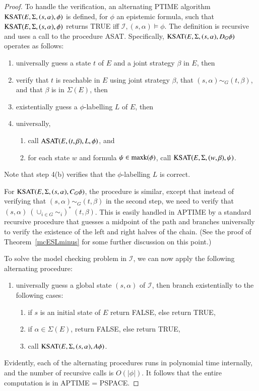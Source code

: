 \documentclass[a4wide]{article}
\theoremstyle{examplesty}
\newcommand{\I}{\mathcal{I}}
\newcommand{\Env}{E}
\newcommand{\be}{\begin{enumerate}}
\newcommand{\ee}{\end{enumerate}}
\newcommand{\Strat}{\Sigma}
\newcommand{\Strats}{\Sigma}
\newcommand{\ksubf}{{\rm maxk}}
\newcommand{\KSAT}{{\rm KSAT}}
\newcommand{\ASAT}{{\rm ASAT}}
\begin{document}
\begin{proof}
To handle the verification, an alternating PTIME algorithm  $\KSAT(E,\Strats, (s,\alpha), \phi)$  is defined, for 
$\phi$ an epistemic formula, such that $\KSAT(E,\Strats, (s,\alpha), \phi)$ returns TRUE 
iff  $\I, (s,\alpha) \models  \phi$.  The definition is recursive and uses a call to the  procedure ASAT. 
Specifically, 
$\KSAT(E,\Strats, (s,\alpha), D_G\phi)$ operates as follows: 
\be 
\item universally guess a state $t$ of $E$ and a joint strategy $\beta$ in $E$, then 


\item  verify that $t$ is reachable in $E$ using joint strategy $\beta$, 
that $(s,\alpha) \sim_G (t,\beta)$, and that $\beta$ is in $\Strats(E)$, then 

\item existentially guess a $\phi$-labelling $L$ of $E$,  then 

\item universally, 
\be \item 
call $\ASAT(E,(t,\beta),L,\phi)$, and 
\item for each state $w$ and formula $\psi \in \ksubf(\phi)$, 
call $\KSAT(E,\Strats, (w,\beta), \psi)$.  
\ee
\ee
Note that  step 4(b) verifies that the 
$\phi$-labelling $L$ is correct. 

For $\KSAT(E,\Strats, (s,\alpha),  C_G\phi)$, 
the procedure is similar, except that instead of verifying that $(s,\alpha) \sim_G (t,\beta)$ in the 
second step, we need to verify that $(s,\alpha) ~(\cup_{i\in G} \sim_i)^* ~(t,\beta)$. 
This is  easily handled in APTIME by a standard recursive procedure that guesses a midpoint of the 
path 
and branches 
universally to verify the existence of the left and right halves of the chain. 
(See the proof of Theorem~\ref{mcESLminus} for some further discussion on this point.) 

To solve the model checking problem in $\I$, 
we can now apply the following alternating procedure: 
\be 
\item universally guess a global state $(s,\alpha)$ of $\I$, then 
branch existentially to the following cases: 
\be 
\item if $s$ is an initial state of $\Env$ return FALSE, else return TRUE, 
\item if $\alpha\in \Strats(\Env)$, return FALSE, else return TRUE, 
\item call $\KSAT(E, \Strat, (s,\alpha), A\phi)$. 
\ee 
\ee
Evidently, each of the alternating procedures runs in polynomial time internally, 
and the number of recursive calls is $O(|\phi|)$. It follows that the entire
computation is in APTIME = PSPACE. 
\end{proof}
\end{document}
